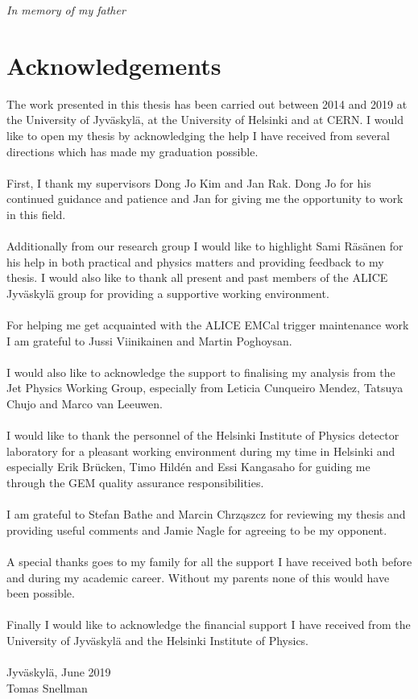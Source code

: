 \clearpage
\begin{flushright}
    \thispagestyle{empty}
    \vspace*{\fill}
    \emph{In memory of my father}
    \vspace*{\fill}
\end{flushright}
\clearpage

\section*{Acknowledgements} 

The work presented in this thesis has been carried out between 2014 and 2019 at the University of Jyväskylä, at the University of Helsinki and at CERN. I would like to open my thesis by acknowledging the help I have received from several directions which has made my graduation possible.
\\~\\
\noindent
First, I thank my supervisors Dong Jo Kim and Jan Rak. Dong Jo for his continued guidance and patience and Jan for giving me the opportunity to work in this field.
\\~\\
\noindent
Additionally from our research group I would like to highlight Sami Räsänen for his help in both practical and physics matters and providing feedback to my thesis. I would also like to thank all present and past members of the ALICE Jyväskylä group for providing a supportive working environment.
\\~\\
\noindent For helping me get acquainted with the ALICE EMCal trigger maintenance work I am grateful to Jussi Viinikainen and Martin Poghoysan.
\\~\\
\noindent I would also like to acknowledge the support to finalising my analysis from the Jet Physics Working Group, especially from Leticia Cunqueiro Mendez, Tatsuya Chujo and Marco van Leeuwen.
\\~\\
\noindent
I would like to thank the personnel of the Helsinki Institute of Physics detector laboratory for a pleasant working environment during my time in Helsinki and especially Erik Brücken, Timo Hildén and Essi Kangasaho for guiding me through the GEM quality assurance responsibilities. 
\\~\\
\noindent
I am grateful to Stefan Bathe and Marcin Chrząszcz for reviewing my thesis and providing useful comments and Jamie Nagle for agreeing to be my opponent.
\\~\\
\noindent
A special thanks goes to my family for all the support I have received both before and during my academic career. Without my parents none of this would have been possible.
\\~\\
\noindent
Finally I would like to acknowledge the financial support I have received from the University of Jyväskylä and the Helsinki Institute of Physics.
\\~\\
Jyväskylä, June 2019\\
Tomas Snellman